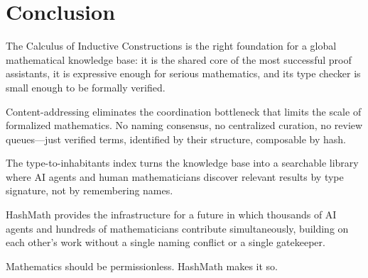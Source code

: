 \documentclass[11pt]{article}
\theoremstyle{definition}
\theoremstyle{plain}
\theoremstyle{remark}
\begin{document}
\section{Conclusion}
\label{sec:conclusion}

The Calculus of Inductive Constructions is the right foundation for a global mathematical
knowledge base: it is the shared core of the most successful proof assistants, it is
expressive enough for serious mathematics, and its type checker is small enough to be
formally verified.

Content-addressing eliminates the coordination bottleneck that limits the scale of formalized
mathematics.
No naming consensus, no centralized curation, no review queues---just verified terms,
identified by their structure, composable by hash.

The type-to-inhabitants index turns the knowledge base into a searchable library where
AI agents and human mathematicians discover relevant results by type signature, not by
remembering names.

HashMath provides the infrastructure for a future in which thousands of AI agents and hundreds
of mathematicians contribute simultaneously, building on each other's work without a single
naming conflict or a single gatekeeper.

Mathematics should be permissionless.
HashMath makes it so.

\bigskip
\end{document}
